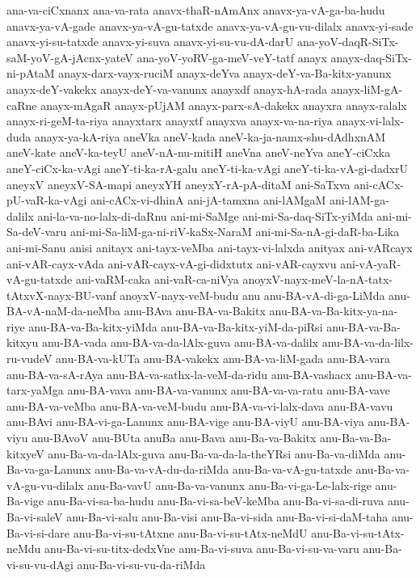 {ana-va-ciCxnanx
ana-va-rata
anavx-thaR-nAmAnx
anavx-ya-vA-ga-ba-hudu
anavx-ya-vA-gade
anavx-ya-vA-gu-tatxde
anavx-ya-vA-gu-vu-dilalx
anavx-yi-sade
anavx-yi-su-tatxde
anavx-yi-suva
anavx-yi-su-vu-dA-darU
ana-yoV-daqR-SiTx-saM-yoV-gA-jAcnx-yateV
ana-yoV-yoRV-ga-meV-veY-tatf
anayx
anayx-daq-SiTx-ni-pAtaM
anayx-darx-vayx-ruciM
anayx-deYva
anayx-deY-va-Ba-kitx-yanunx
anayx-deY-vakekx
anayx-deY-va-vanunx
anayxdf
anayx-hA-rada
anayx-liM-gA-caRne
anayx-mAgaR
anayx-pUjAM
anayx-parx-sA-dakekx
anayxra
anayx-ralalx
anayx-ri-geM-ta-riya
anayxtarx
anayxtf
anayxva
anayx-va-na-riya
anayx-vi-lalx-duda
anayx-ya-kA-riya
aneVka
aneV-kada
aneV-ka-ja-namx-shu-dAdhxnAM
aneV-kate
aneV-ka-teyU
aneV-nA-nu-mitiH
aneVna
aneV-neYva
aneY-ciCxka
aneY-ciCx-ka-vAgi
aneY-ti-ka-rA-galu
aneY-ti-ka-vAgi
aneY-ti-ka-vA-gi-dadxrU
aneyxV
aneyxV-SA-mapi
aneyxYH
aneyxY-rA-pA-ditaM
ani-SaTxva
ani-cACx-pU-vaR-ka-vAgi
ani-cACx-vi-dhinA
ani-jA-tamxna
ani-lAMgaM
ani-lAM-ga-dalilx
ani-la-va-no-lalx-di-daRnu
ani-mi-SaMge
ani-mi-Sa-daq-SiTx-yiMda
ani-mi-Sa-deV-varu
ani-mi-Sa-liM-ga-ni-riV-kaSx-NaraM
ani-mi-Sa-nA-gi-daR-ba-Lika
ani-mi-Sanu
anisi
anitayx
ani-tayx-veMba
ani-tayx-vi-lalxda
anityax
ani-vARcayx
ani-vAR-cayx-vAda
ani-vAR-cayx-vA-gi-didxtutx
ani-vAR-cayxvu
ani-vA-yaR-vA-gu-tatxde
ani-vaRM-caka
ani-vaR-ca-niVya
anoyxV-nayx-meV-la-nA-tatx-tAtxvX-nayx-BU-vanf
anoyxV-nayx-veM-budu
anu
anu-BA-vA-di-ga-LiMda
anu-BA-vA-naM-da-neMba
anu-BAva
anu-BA-va-Bakitx
anu-BA-va-Ba-kitx-ya-na-riye
anu-BA-va-Ba-kitx-yiMda
anu-BA-va-Ba-kitx-yiM-da-piRsi
anu-BA-va-Ba-kitxyu
anu-BA-vada
anu-BA-va-da-lAlx-guva
anu-BA-va-dalilx
anu-BA-va-da-lilx-ru-vudeV
anu-BA-va-kUTa
anu-BA-vakekx
anu-BA-va-liM-gada
anu-BA-vara
anu-BA-va-sA-rAya
anu-BA-va-sathx-la-veM-da-ridu
anu-BA-vashacx
anu-BA-va-tarx-yaMga
anu-BA-vava
anu-BA-va-vanunx
anu-BA-va-va-ratu
anu-BA-vave
anu-BA-va-veMba
anu-BA-va-veM-budu
anu-BA-va-vi-lalx-dava
anu-BA-vavu
anu-BAvi
anu-BA-vi-ga-Lanunx
anu-BA-vige
anu-BA-viyU
anu-BA-viya
anu-BA-viyu
anu-BAvoV
anu-BUta
anuBa
anu-Bava
anu-Ba-va-Bakitx
anu-Ba-va-Ba-kitxyeV
anu-Ba-va-da-lAlx-guva
anu-Ba-va-da-la-theYRsi
anu-Ba-va-diMda
anu-Ba-va-ga-Lanunx
anu-Ba-va-vA-du-da-riMda
anu-Ba-va-vA-gu-tatxde
anu-Ba-va-vA-gu-vu-dilalx
anu-Ba-vavU
anu-Ba-va-vanunx
anu-Ba-vi-ga-Le-lalx-rige
anu-Ba-vige
anu-Ba-vi-sa-ba-hudu
anu-Ba-vi-sa-beV-keMba
anu-Ba-vi-sa-di-ruva
anu-Ba-vi-saleV
anu-Ba-vi-salu
anu-Ba-visi
anu-Ba-vi-sida
anu-Ba-vi-si-daM-taha
anu-Ba-vi-si-dare
anu-Ba-vi-su-tAtxne
anu-Ba-vi-su-tAtx-neMdU
anu-Ba-vi-su-tAtx-neMdu
anu-Ba-vi-su-titx-dedxVne
anu-Ba-vi-suva
anu-Ba-vi-su-va-varu
anu-Ba-vi-su-vu-dAgi
anu-Ba-vi-su-vu-da-riMda
}
